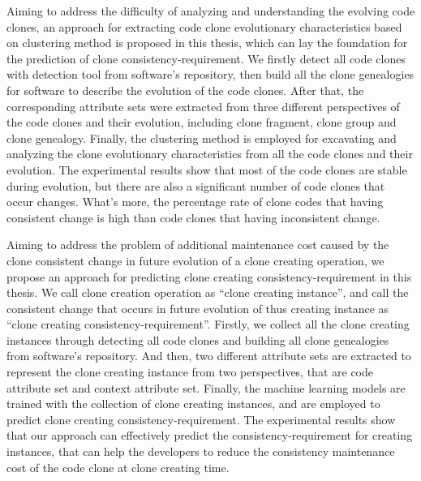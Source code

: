 {Aiming to address the difficulty of analyzing and understanding the evolving code clones, an approach for extracting code clone evolutionary characteristics based on clustering method is proposed in this thesis, which can lay the foundation for the prediction of clone consistency-requirement.
We firstly detect all code clones with detection tool from software's repository, then build all the clone genealogies for software to describe the evolution of the code clones.
After that, the corresponding attribute sets were extracted from three different perspectives of the code clones and their evolution, including clone fragment, clone group and clone genealogy. 
Finally, the clustering method is employed for excavating and analyzing the clone evolutionary characteristics from all the code clones and their evolution. 
The experimental results show that most of the code clones are stable during evolution, but there are also a significant number of code clones that occur changes. 
What's more, the percentage rate of clone codes that having consistent change is high than code clones that having inconsistent change.

Aiming to address the problem of additional maintenance cost caused by the clone consistent change in future evolution of a clone creating operation, we propose an approach for predicting clone creating consistency-requirement in this thesis.
We call clone creation operation as ``clone creating instance'', and call the consistent change that occurs in future evolution of thus creating instance as ``clone creating consistency-requirement''.
Firstly, we collect all the clone creating instances through detecting all code clones and building all clone genealogies from software's repository.
And then, two different attribute sets are extracted to represent the clone creating instance from two perspectives, that are code attribute set and context attribute set.
Finally, the machine learning models are trained with the collection of clone creating instances, and are employed to predict clone creating consistency-requirement. 
The experimental results show that our approach can effectively predict the consistency-requirement for creating instances, that can help the developers to reduce the consistency maintenance cost of the code clone at clone creating time.

}
